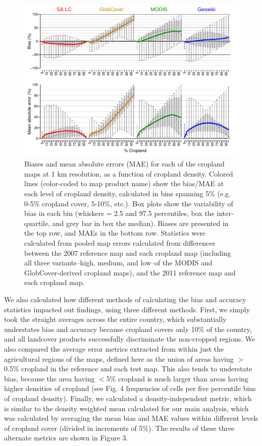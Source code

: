 \documentclass[11pt, titlepage]{article}
\begin{document}
\begin{figure}[!ht]
  \centering
     \includegraphics[width = 14cm]{figures/biases_1km.pdf} 
      \caption{Biases and mean absolute errors (MAE) for each of the cropland maps at 1 km resolution, as a function of cropland density. Colored lines (color-coded to map product name) show the bias/MAE at each level of cropland density, calculated in bins spanning 5\% (e.g. 0-5\% cropland cover, 5-10\%, etc.). Box plots show the variability of bias in each bin (whiskers = 2.5 and 97.5 percentiles, box the inter-quartile, and grey bar in box the median). Biases are presented in the top row, and MAEs in the bottom row. Statistics were calculated from pooled map errors calculated from differences between the 2007 reference map and each cropland map (including all three variants--high, medium, and low--of the MODIS and GlobCover-derived cropland maps), and the 2011 reference map and each cropland map. }
      \label{fig:default}
\end{figure}

We also calculated how different methods of calculating the bias and accuracy statistics impacted out findings, using three different methods. First, we simply took the straight averages across the entire country, which substantially understates bias and accuracy because cropland covers only 10\% of the country, and all landcover products successfully discriminate the non-cropped regions.  We also compared the average error metrics extracted from within just the agricultural regions of the maps, defined here as the union of areas having $>$0.5\% cropland in the reference and each test map. This also tends to understate bias, because the area having $<$5\% cropland is much larger than areas having higher densities of cropland (see Fig. 4 frequencies of cells per five percentile bins of cropland density). Finally, we calculated a density-independent metric, which is similar to the density weighted mean calculated for our main analysis, which was calculated by averaging the mean bias and MAE values within different levels of cropland cover (divided in increments of 5\%). The results of these three alternate metrics are shown in Figure 3. 
\end{document}
